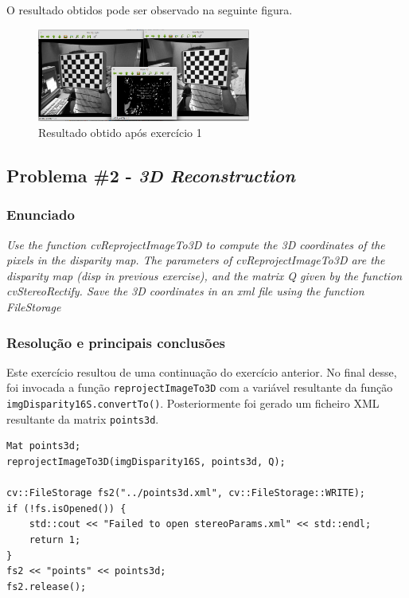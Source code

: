 \documentclass[portuguese, times, mirror]{revdetua}
\begin{document}
O resultado obtidos pode ser observado na seguinte figura. 

\begin{figure}[ht!]
\centering
\includegraphics[width=70mm]{img/ex1.png}
\caption{Resultado obtido após exercício 1}
\end{figure}



\subsection{Problema \#2 - \textit{3D Reconstruction}}

\subsubsection{Enunciado}
\textit{Use the function cvReprojectImageTo3D to compute the 3D coordinates of the pixels in the disparity 
map. The parameters of cvReprojectImageTo3D are the disparity map (disp in previous exercise), and the
matrix Q given by the function cvStereoRectify. Save the 3D coordinates in an xml file using the 
function FileStorage}


\subsubsection{Resolução e principais conclusões}

Este exercício resultou de uma continuação do exercício anterior. No final desse, foi invocada a função \texttt{reprojectImageTo3D} com a variável resultante da função \texttt{imgDisparity16S.convertTo()}. Posteriormente foi gerado um ficheiro XML resultante da matrix \texttt{points3d}.  


\begin{lstlisting}[caption=Aplicação da função reprojectImageTo3D e criação do ficheiro XML ,label=code:C]
Mat points3d;
reprojectImageTo3D(imgDisparity16S, points3d, Q);

cv::FileStorage fs2("../points3d.xml", cv::FileStorage::WRITE);
if (!fs.isOpened()) {
    std::cout << "Failed to open stereoParams.xml" << std::endl;
    return 1;
}
fs2 << "points" << points3d;
fs2.release();

\end{lstlisting}
\end{document}
